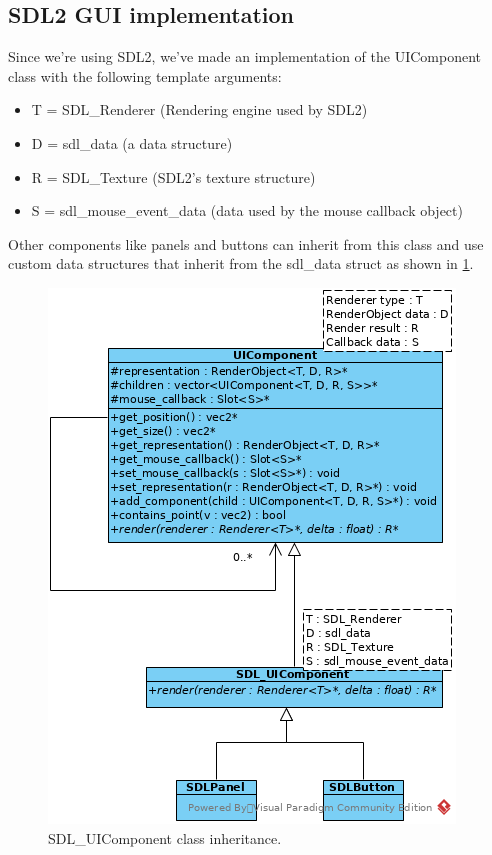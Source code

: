 \subsection{SDL2 GUI implementation}
\label{sec:sdl2gui}

Since we're using SDL2, we've made an implementation of the UIComponent class
 with the following template arguments:
\begin{itemize}
\item T = SDL\_Renderer (Rendering engine used by SDL2)
\item D = sdl\_data (a data structure)
\item R = SDL\_Texture (SDL2's texture structure)
\item S = sdl\_mouse\_event\_data (data used by the mouse callback object)
\end{itemize}

Other components like panels and buttons can inherit from this class and use 
custom data structures that inherit from the sdl\_data struct as shown in 
\cref{fig:sdluicomponent-inherit}.

\begin{figure}[!htb]
\centering
\includegraphics[scale=0.75]{res/ui/sdluicomponent-inherit.png}
\caption{SDL\_UIComponent class inheritance.}\label{fig:sdluicomponent-inherit}
\end{figure}

